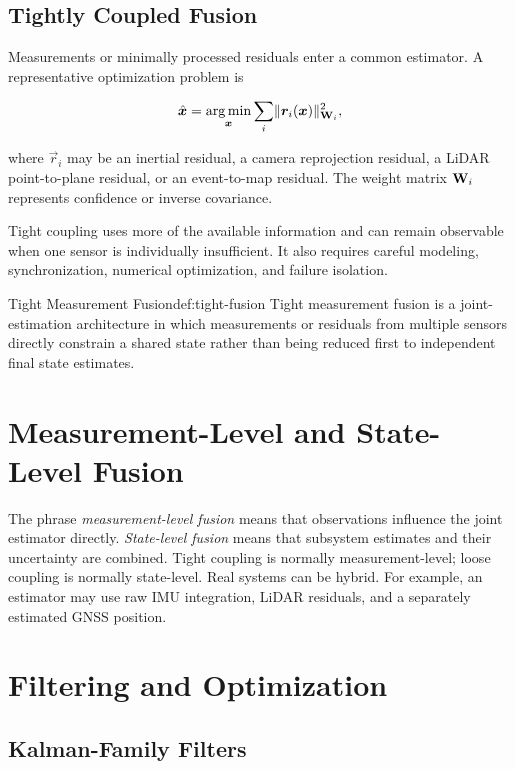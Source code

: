 \subsection{Tightly Coupled Fusion}

Measurements or minimally processed residuals enter a common estimator. A representative optimization problem is

\[
    \hat{\bm{x}}
    = \operatorname*{arg\,min}_{\bm{x}}
      \sum_i \lVert\bm{r}_i(\bm{x})\rVert_{\mathbf{W}_i}^{2},
\]

where \(\vec{r}_i\) may be an inertial residual, a camera reprojection residual, a LiDAR point-to-plane residual, or an event-to-map residual. The weight matrix \(\mathbf{W}_i\) represents confidence or inverse covariance.

Tight coupling uses more of the available information and can remain observable when one sensor is individually insufficient. It also requires careful modeling, synchronization, numerical optimization, and failure isolation.

\begin{definition}{Tight Measurement Fusion}{def:tight-fusion}
Tight measurement fusion is a joint-estimation architecture in which measurements or residuals from multiple sensors directly constrain a shared state rather than being reduced first to independent final state estimates.
\end{definition}

\section{Measurement-Level and State-Level Fusion}

The phrase \emph{measurement-level fusion} means that observations influence the joint estimator directly. \emph{State-level fusion} means that subsystem estimates and their uncertainty are combined. Tight coupling is normally measurement-level; loose coupling is normally state-level. Real systems can be hybrid. For example, an estimator may use raw IMU integration, LiDAR residuals, and a separately estimated GNSS position.

\section{Filtering and Optimization}

\subsection{Kalman-Family Filters}

